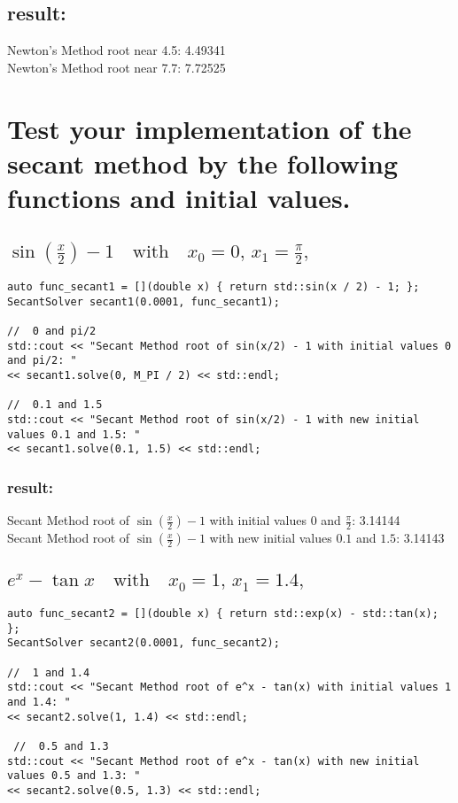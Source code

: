 \documentclass[a4paper]{article}
\begin{document}
\subsection*{result:}
Newton's Method root near 4.5: 4.49341 \\
Newton's Method root near 7.7: 7.72525
\section{Test your implementation of the secant method by the
following functions and initial values.}
\subsection{$\sin\left(\frac{x}{2}\right) - 1 \quad \text{with} \quad x_0 = 0, \, x_1 = \frac{\pi}{2},$}
\begin{lstlisting}
auto func_secant1 = [](double x) { return std::sin(x / 2) - 1; };
SecantSolver secant1(0.0001, func_secant1);

//  0 and pi/2
std::cout << "Secant Method root of sin(x/2) - 1 with initial values 0 and pi/2: "
<< secant1.solve(0, M_PI / 2) << std::endl;

//  0.1 and 1.5
std::cout << "Secant Method root of sin(x/2) - 1 with new initial values 0.1 and 1.5: "
<< secant1.solve(0.1, 1.5) << std::endl;
\end{lstlisting}
\subsubsection*{result:}
Secant Method root of $\sin\left(\frac{x}{2}\right) - 1$ with initial values $0$ and $\frac{\pi}{2}$: 3.14144 \\
Secant Method root of $\sin\left(\frac{x}{2}\right) - 1$ with new initial values $0.1$ and $1.5$: 3.14143
\subsection{$e^x - \tan{x} \quad \text{with} \quad x_0 = 1, \, x_1 = 1.4,$}
\begin{lstlisting}
auto func_secant2 = [](double x) { return std::exp(x) - std::tan(x); };
SecantSolver secant2(0.0001, func_secant2);

//  1 and 1.4
std::cout << "Secant Method root of e^x - tan(x) with initial values 1 and 1.4: "
<< secant2.solve(1, 1.4) << std::endl;

 //  0.5 and 1.3
std::cout << "Secant Method root of e^x - tan(x) with new initial values 0.5 and 1.3: "
<< secant2.solve(0.5, 1.3) << std::endl;
\end{lstlisting}
\end{document}
